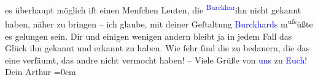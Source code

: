                es überhaupt möglich iſt \introOben{}einen\introOben{} Menſchen Leuten, die \substVorne{}\textsuperscript{\textcolor{gray}{\textcolor{blue}{Burckhar}{}\ledrightnote{\textcolor{blue}{Max Eugen Burckhard}}}}{\allowbreak}\substDazwischen{}ihn\substHinten{} nicht gekannt haben, näher zu bringen – ich glaube, mit deiner Geſtaltung
                  \textcolor{blue}{Burckhards}{}\ledrightnote{\textcolor{blue}{Max Eugen Burckhard}} m\substVorne{}\textsuperscript{uſs}\substDazwischen{}üßte\substHinten{} es gelungen sein. Dir und einigen wenigen andern bleibt ja in jedem Fall das
               Glück ihn gekannt und erkannt zu haben. Wie ſehr ſind die zu bedauern, die das eine
               verſäumt, das andre nicht vermocht haben! –\pend
           \pstart
           Viele Grüße von \textcolor{blue}{uns}{} zu \textcolor{blue}{Euch}{}!{\\[\baselineskip]}Dein
                  \spacefill\mbox{Arthur}\pend
           \leftskip=0em{}\endnumbering{}  
      